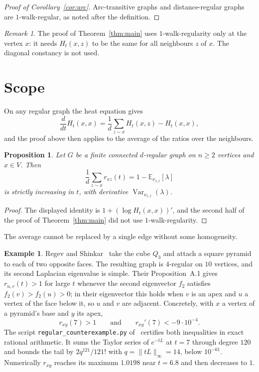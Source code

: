 \documentclass[11pt]{amsart}
\newtheorem{proposition}[theorem]{Proposition}
\theoremstyle{definition}
\newtheorem{example}[theorem]{Example}
\theoremstyle{remark}
\newtheorem{remark}[theorem]{Remark}
\DeclareMathOperator{\Var}{Var}
\newcommand{\E}{\mathbb{E}}
\begin{document}
\begin{proof}[Proof of Corollary~\ref{cor:arc}]
Arc-transitive graphs and distance-regular graphs are $1$-walk-regular, as noted after the definition.
\end{proof}

\begin{remark}
The proof of Theorem~\ref{thm:main} uses $1$-walk-regularity only at the vertex $x$: it needs $H_t(x,z)$ to be the same for all neighbours $z$ of $x$. The diagonal constancy is not used.
\end{remark}

\section{Scope}\label{sec:scope}

On any regular graph the heat equation gives
\[
\frac{d}{dt}H_t(x,x)=\frac1d\sum_{z\sim x}H_t(x,z)-H_t(x,x),
\]
and the proof above then applies to the average of the ratios over the neighbours.

\begin{proposition}\label{prop:average}
Let $G$ be a finite connected $d$-regular graph on $n\ge2$ vertices and $x\in V$. Then
\[
\frac1d\sum_{z\sim x}r_{xz}(t)=1-\E_{\nu_{x,t}}[\lambda]
\]
is strictly increasing in $t$, with derivative $\Var_{\nu_{x,t}}(\lambda)$.
\end{proposition}

\begin{proof}
The displayed identity is $1+(\log H_t(x,x))'$, and the second half of the proof of Theorem~\ref{thm:main} did not use $1$-walk-regularity.
\end{proof}

The average cannot be replaced by a single edge without some homogeneity.

\begin{example}\label{ex:regular}
Regev and Shinkar~\cite[Appendix~A]{RS} take the cube $Q_3$ and attach a square pyramid to each of two opposite faces. The resulting graph is $4$-regular on $10$ vertices, and its second Laplacian eigenvalue is simple. Their Proposition~A.1 gives $r_{u,v}(t)>1$ for large $t$ whenever the second eigenvector $f_2$ satisfies $f_2(v)>f_2(u)>0$; in their eigenvector this holds when $v$ is an apex and $u$ a vertex of the face below it, so $u$ and $v$ are adjacent. Concretely, with $x$ a vertex of a pyramid's base and $y$ its apex,
\[
r_{xy}(7)>1\qquad\text{and}\qquad r_{xy}'(7)<-9\cdot10^{-4} .
\]
The script \texttt{regular\_counterexample.py} of~\cite{code} certifies both inequalities in exact rational arithmetic. It sums the Taylor series of $e^{-tL}$ at $t=7$ through degree $120$ and bounds the tail by $2q^{121}/121!$ with $q=\|tL\|_\infty=14$, below $10^{-61}$. Numerically $r_{xy}$ reaches its maximum $1.0198$ near $t=6.8$ and then decreases to $1$.
\end{example}
\end{document}
